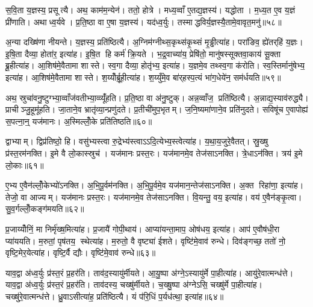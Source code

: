 स॒वि॒ता य॒ज्ञस्य॒ प्रसूत्यै। अथ॒ काम॑म॒न्येन॑। ततो॒ होत्रे। मध्य॒व्वाँ ए॒तद्य॒ज्ञस्य॑। यद्धोता। म॒ध्य॒त ए॒व य॒ज्ञं प्री॑णाति। अथाध्व॒र्यवे। प्र॒ति॒ष्ठा वा ए॒षा य॒ज्ञस्य॑। यद॑ध्व॒र्युः। तस्माद्धविर्य॒ज्ञस्यै॒तामे॒वावृत॒मनु॑॥५८॥

अ॒न्या दख्षि॑णा नीयन्ते। य॒ज्ञस्य॒ प्रति॑ष्ठित्यै। अ॒ग्निम॑ग्नीथ्स॒कृथ्स॑कृ॒थ्सं मृ॒ड्ढीत्या॑ह। परा॑ङिव॒ ह्ये॑तर्‌हि॑ य॒ज्ञः। इ॒षि॒ता दैव्या॒ होता॑र॒ इत्या॑ह। इ॒षि॒त हि कर्म॑ क्रि॒यते। भ॒द्र॒वाच्या॑य॒ प्रेषि॑तो॒ मानु॑षस्सूक्तवा॒काय॑ सू॒क्ता ब्रू॒हीत्या॑ह। आ॒शिष॑मे॒वैतामा शास्ते। स्व॒गा दैव्या॒ होतृ॑भ्य॒ इत्या॑ह। य॒ज्ञमे॒व तथ्स्व॒गा क॑रोति। स्व॒स्तिर्मानु॑षेभ्य॒ इत्या॑ह। आ॒शिष॑मे॒वैतामा शास्ते। श॒य्योँर्ब्रू॒हीत्या॑ह। श॒य्युँमे॒व बा॑र्‌हस्प॒त्यं भा॑ग॒धेये॑न॒ सम॑र्धयति॥५९॥\anuvakamend[च॒र॒त्य॒ध्व॒र्युः प्रजा॑तिर्ह्वयते॒ वेदाब्रवीद्बर्‌हि॒षद॑ङ्करोत्यृ॒त्विजो॑ दधाति ब्र॒ह्माऽनु॑करोति च॒त्वारि॑ च]

अथ॒ स्रुचा॑वनु॒ष्टुग्भ्या॒व्वाँज॑वतीभ्या॒व्व्यूँ॑हति। प्र॒ति॒ष्ठा वा अ॑नु॒ष्टुक्। अन्न॒व्वाँज॒ प्रति॑ष्ठित्यै। अ॒न्नाद्य॒स्याव॑रुद्ध्यै। प्राचीञ्जु॒हूमू॑हति। जा॒ताने॒व भ्रातृ॑व्या॒न्प्रणु॑दते। प्र॒तीची॑मुप॒भृतम्। ज॒नि॒ष्यमा॑णाने॒व प्रति॑नुदते। सविषू॑च ए॒वापोह्य॑ स॒पत्ना॒न्॒ यज॑मानः। अ॒स्मिल्लोँ॒के प्रति॑तिष्ठति॥६०॥

द्वाभ्याम्। द्विप्र॑तिष्ठो॒ हि। वसु॑भ्यस्त्वा रु॒द्रेभ्य॑स्त्वाऽऽदि॒त्येभ्य॒स्त्वेत्या॑ह। य॒था॒य॒जुरे॒वैतत्। स्रु॒ख्षु प्र॑स्त॒रम॑नक्ति। इ॒मे वै लो॒कास्स्रुच॑। यज॑मानः प्रस्त॒रः। यज॑मानमे॒व तेज॑साऽनक्ति। त्रे॒धाऽन॑क्ति। त्रय॑ इ॒मे लो॒काः॥६१॥

ए॒भ्य ए॒वैन॑ल्लोँ॒केभ्यो॑ऽनक्ति। अ॒भि॒पू॒र्वम॑नक्ति। अ॒भि॒पू॒र्वमे॒व यज॑मान॒न्तेज॑साऽनक्ति। अ॒क्त रिहा॑णा॒ इत्या॑ह। तेजो॒ वा आज्यम्। यज॑मानः प्रस्त॒रः। यज॑मानमे॒व तेज॑साऽनक्ति। वि॒यन्तु॒ वय॒ इत्या॑ह। वय॑ ए॒वैन॑ङ्कृ॒त्वा। सु॒व॒र्गल्लोँ॒कङ्ग॑मयति॥६२॥

प्र॒जाय्योँनिं॒ मा निर्मृ॑ख्ष॒मित्या॑ह। प्र॒जायै॑ गोपी॒थाय॑। आप्या॑यन्ता॒माप॒ ओष॑धय॒ इत्या॑ह। आप॑ ए॒वौष॑धी॒रा प्या॑ययति। म॒रुतां॒ पृष॑तय॒ स्थेत्या॑ह। म॒रुतो॒ वै वृष्ट्या॑ ईशते। वृष्टि॑मे॒वाव॑ रुन्धे। दिव॑ङ्गच्छ॒ ततो॑ नो॒ वृष्टि॒मेर॒येत्या॑ह। वृष्टि॒र्वै द्यौः। वृष्टि॑मे॒वाव॑ रुन्धे॥६३॥

याव॒द्वा अ॑ध्व॒र्युः प्र॑स्त॒रं प्र॒हर॑ति। ताव॑द॒स्यायु॑र्मीयते। आ॒यु॒ष्पा अ॑ग्ने॒ऽस्यायु॑र्मे पा॒हीत्या॑ह। आयु॑रे॒वात्मन्ध॑त्ते। याव॒द्वा अ॑ध्व॒र्युः प्र॑स्त॒रं प्र॒हर॑ति। ताव॑दस्य॒ चख्षु॑र्मीयते। च॒ख्षु॒ष्पा अ॑ग्नेऽसि॒ चख्षु॑र्मे पा॒हीत्या॑ह। चख्षु॑रे॒वात्मन्ध॑त्ते। ध्रु॒वाऽसीत्या॑ह॒ प्रति॑ष्ठित्यै। यं प॑रि॒धिं प॒र्यध॑त्था॒ इत्या॑ह॥६४॥

